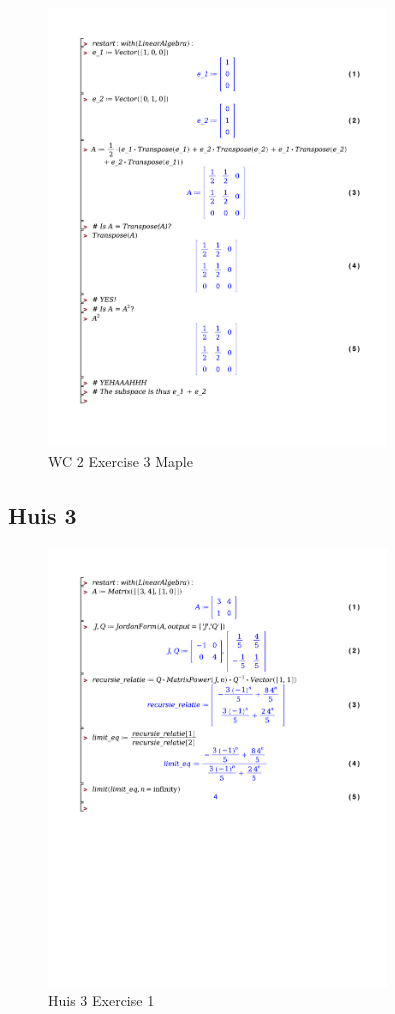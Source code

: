 \documentclass[a4paper]{report}
\begin{document}
\begin{figure}[H]
	\centering
	\includegraphics[width=0.8\textwidth]{exercises/wc_2_ex_3.pdf}
	\caption{WC 2 Exercise 3 Maple}
	\label{fig:wc_2_ex_3_maple}
\end{figure}

\newpage
\subsection*{Huis 3}


\begin{figure}[H]
	\centering
	\includegraphics[width=0.8\textwidth]{exercises/huis_3_ex_1.pdf}
	\caption{Huis 3 Exercise 1}
	\label{fig:huis_3_ex_1_Maple}
\end{figure}
\end{document}
